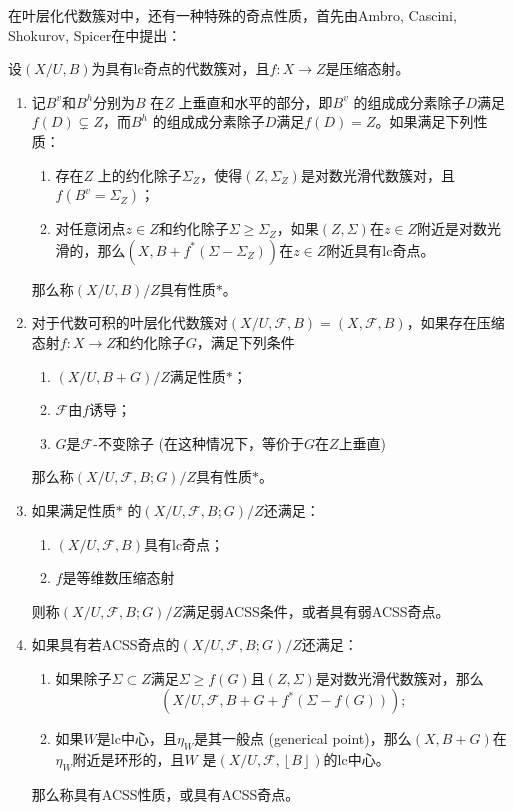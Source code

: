 在叶层化代数簇对中，还有一种特殊的奇点性质，首先由Ambro, Cascini, Shokurov, Spicer在\cite{acss}中提出：
\begin{definition}[ACSS奇点]\cite[Definition 4.1-3]{acc_foliation}
 设$ (X/U,B) $为具有lc奇点的代数簇对，且$f: X\to Z$是压缩态射。
\begin{enumerate}
  \item 记$B^{v}$和$ B^{h}$分别为$B$ 在$Z$ 上垂直和水平的部分，即$B^{v}$ 的组成成分素除子$D$满足$f(D)\subsetneq Z $，而$B^{h}$  的组成成分素除子$D$满足$f(D)= Z$。如果满足下列性质：
        \begin{enumerate}
          \item 存在$Z$ 上的约化除子$\Sigma_{Z}$，使得$(Z,\Sigma_{Z}) $是对数光滑代数簇对，且$f(B^{v}=\Sigma_{Z})$；
          \item 对任意闭点$z \in Z$和约化除子$\Sigma \geqslant \Sigma_{Z}$，如果$(Z,\Sigma)$在$z \in Z$附近是对数光滑的，那么$(X,B+f^{*}(\Sigma-\Sigma_{Z}))$在$z \in Z$附近具有lc奇点。 
        \end{enumerate}
        那么称$(X/U,B)/Z$具有性质$*$。
  \item 对于代数可积的叶层化代数簇对$(X/U,\mathcal{F},B)=(X,\mathcal{F},B)$，如果存在压缩态射$f:X \to Z$和约化除子$G$，满足下列条件
        \begin{enumerate}
          \item $(X/U,B+G)/Z$满足性质$*$；
          \item $\mathcal{F}$由$ f$诱导；
          \item $G$是$\mathcal{F}$-不变除子 (在这种情况下，等价于$G$在$Z$上垂直)
        \end{enumerate}
      那么称$(X/U,\mathcal{F},B;G)/Z$具有性质$*$。
    \item 如果满足性质$*$ 的$(X/U,\mathcal{F},B;G)/Z$还满足：
          \begin{enumerate}
            \item $(X/U,\mathcal{F},B)$具有lc奇点；
            \item $f$是等维数压缩态射
          \end{enumerate}
          则称$(X/U,\mathcal{F},B;G)/Z$满足弱ACSS条件，或者具有弱ACSS奇点。
    \item 如果具有若ACSS奇点的$(X/U,\mathcal{F},B;G)/Z$还满足：
          \begin{enumerate}
            \item 如果除子$\Sigma \subset Z$满足$\Sigma \geqslant f(G)$且$(Z,\Sigma)$是对数光滑代数簇对，那么
              \[ (X/U,\mathcal{F},B+G+f^{*}(\Sigma - f(G ))) ;\]
            \item 如果$W$是lc中心，且$ \eta_{W}$是其一般点 (generical point)，那么$(X,B+G)$在$\eta_{W}$附近是环形的，且$W$ 是$(X/U,\mathcal{F},\left\lfloor B \right\rfloor )$的lc中心。
          \end{enumerate}
          那么称具有ACSS性质，或具有ACSS奇点。
\end{enumerate}
\end{definition}
